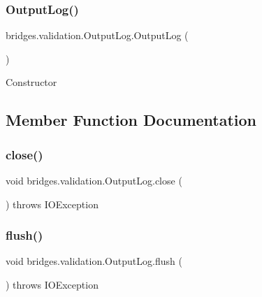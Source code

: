 \subsubsection{\texorpdfstring{Output\+Log()}{OutputLog()}}
{\footnotesize\ttfamily bridges.\+validation.\+Output\+Log.\+Output\+Log (\begin{DoxyParamCaption}{ }\end{DoxyParamCaption})}

Constructor 

\subsection{Member Function Documentation}
\hypertarget{classbridges_1_1validation_1_1_output_log_a6ab7881cd35aa11cc830dab4732fe66d}{}\label{classbridges_1_1validation_1_1_output_log_a6ab7881cd35aa11cc830dab4732fe66d} 
\subsubsection{\texorpdfstring{close()}{close()}}
{\footnotesize\ttfamily void bridges.\+validation.\+Output\+Log.\+close (\begin{DoxyParamCaption}{ }\end{DoxyParamCaption}) throws I\+O\+Exception}

\hypertarget{classbridges_1_1validation_1_1_output_log_ab810fd1e3d7e939bcdf1ec38978c02cd}{}\label{classbridges_1_1validation_1_1_output_log_ab810fd1e3d7e939bcdf1ec38978c02cd} 
\subsubsection{\texorpdfstring{flush()}{flush()}}
{\footnotesize\ttfamily void bridges.\+validation.\+Output\+Log.\+flush (\begin{DoxyParamCaption}{ }\end{DoxyParamCaption}) throws I\+O\+Exception}

\hypertarget{classbridges_1_1validation_1_1_output_log_aea898d0de8715c1451d4731f3d9ae91d}{}\label{classbridges_1_1validation_1_1_output_log_aea898d0de8715c1451d4731f3d9ae91d} 
